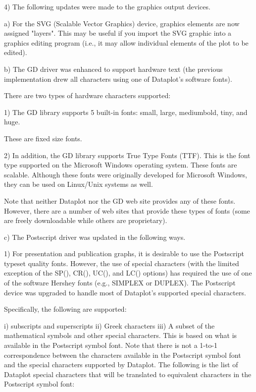 { 4) The following updates were made to the graphics output
    devices.

    a) For the SVG (Scalable Vector Graphics) device, graphics
       elements are now assigned "layers".  This may be useful
       if you import the SVG graphic into a graphics editing
       program (i.e., it may allow individual elements of the
       plot to be edited).

    b) The GD driver was enhanced to support hardware text (the
       previous implementation drew all characters using one
       of Dataplot's software fonts).

       There are two types of hardware characters supported:

          1) The GD library supports 5 built-in fonts: small,
             large, mediumbold, tiny, and huge.

             These are fixed size fonts.

          2) In addition, the GD library supports True Type Fonts
             (TTF).  This is the font type supported on the
             Microsoft Windows operating system.  These fonts
             are scalable.  Although these fonts were originally
             developed for Microsoft Windows, they can be used
             on Linux/Unix systems as well.

             Note that neither Dataplot nor the GD web site
             provides any of these fonts.  However, there are
             a number of web sites that provide these types of
             fonts (some are freely downloadable while others
             are proprietary).

    c) The Postscript driver was updated in the following ways.

       1) For presentation and publication graphs, it is desirable
          to use the Postscript typeset quality fonts.  However,
          the use of special characters (with the limited exception
          of the SP(), CR(), UC(), and LC() options) has required
          the use of one of the software Hershey fonts (e.g.,
          SIMPLEX or DUPLEX).  The Postscript device was upgraded
          to handle most of Dataplot's supported special characters.

          Specifically, the following are supported:

             i) subscripts and superscripts
            ii) Greek characters
           iii) A subset of the mathematical symbols and other
                special characters.  This is based on what is
                available in the Postscript symbol font.  Note
                that there is not a 1-to-1 correspondence between
                the characters available in the Postscript symbol
                font and the special characters supported by
                Dataplot.  The following is the list of Dataplot
                special characters that will be translated to
                equivalent characters in the Postscript symbol font:

}
